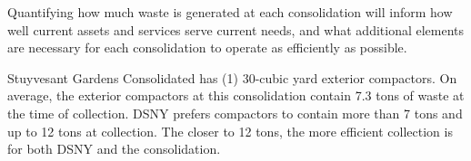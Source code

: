 
    Quantifying how much waste is generated at each consolidation will inform how well current assets and services serve current needs, and what additional elements are necessary for each consolidation to operate as efficiently as possible.
    
    Stuyvesant Gardens Consolidated has (1) 30-cubic yard exterior compactors. On average, the exterior compactors at this consolidation contain 7.3 tons of waste at the time of collection. DSNY prefers compactors to contain more than 7 tons and up to 12 tons at collection. The closer to 12 tons, the more efficient collection is for both DSNY and the consolidation.
